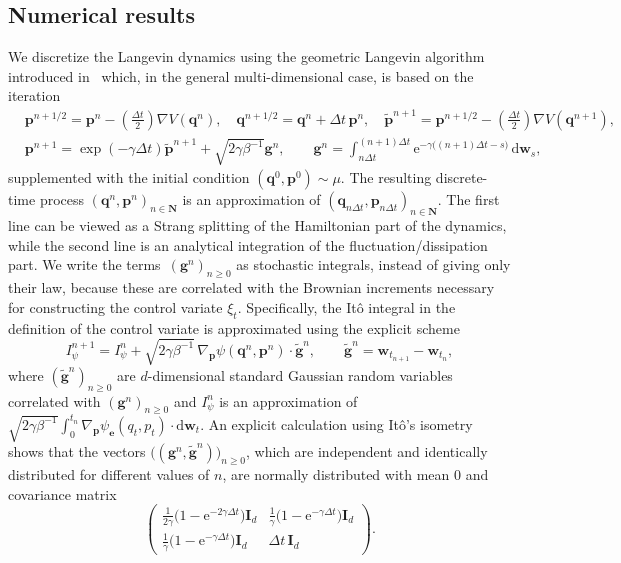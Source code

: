 \documentclass[11pt,a4paper]{article}
\newcommand{\e}{\mathrm{e}}
\newcommand{\nat}{\mathbf N}
\newcommand{\grad}{\nabla}
\newcommand{\vect}[1]{\boldsymbol{\mathbf #1}}
\newcommand{\mat}[1]{\vect #1}
\renewcommand{\d}{\mathrm d}
\theoremstyle{plain}
\numberwithin{equation}{section}
\renewcommand{\geq}{\geqslant}
\begin{document}
\subsection{Numerical results}%
\label{sub:numerical_results}
We discretize the Langevin dynamics using the geometric Langevin algorithm introduced in~\cite{MR2608370} which,
in the general multi-dimensional case, is based on the iteration
\begin{align*}
    & \vect p^{n+1/2} = \vect p^n - \left(\frac{\Delta t}{2}\right) \grad V(\vect q^n),
    \quad \vect q^{n+1/2} = \vect q^n + \Delta t \, \vect p^n,
    \quad \widetilde {\vect p}^{n+1} = \vect p^{n+1/2} - \left(\frac{\Delta t}{2}\right) \grad V(\vect q^{n+1}), \\
    & \vect p^{n+1} = \exp \left(- \gamma \Delta t \right) \widetilde {\vect p}^{n+1}
    + \sqrt{2 \gamma \beta^{-1}} \vect g^n, \qquad \vect g^n = \int_{n \Delta t}^{(n+1)\Delta t} \e^{-\gamma \bigl((n+1)\Delta t-s\bigr)} \, \d \vect w_s,
\end{align*}
supplemented with the initial condition $(\vect q^0, \vect p^0) \sim \mu$.
The resulting discrete-time process $(\vect q^n, \vect p^n)_{n \in \nat}$ is an approximation of $(\vect q_{n \Delta t}, \vect p_{n \Delta t})_{n \in \nat}$.
The first line can be viewed as a Strang splitting of the Hamiltonian part of the dynamics,
while the second line is an analytical integration of the fluctuation/dissipation part.
We write the terms~$(\vect g^n)_{n\geq0}$ as stochastic integrals, instead of giving only their law,
because these are correlated with the Brownian increments necessary for constructing the control variate $\xi_t$.
Specifically, the It\^o integral in the definition of the control variate is approximated using the explicit scheme
\[
    I_{\psi}^{n+1} = I_{\psi}^n + \sqrt{2 \gamma \beta^{-1}} \, \grad_{\vect p} \psi(\vect q^{n}, \vect p^{n}) \cdot
    \widetilde {\vect g}^n, \qquad \widetilde {\vect g}^n = \vect w_{t_{n+1}} - \vect w_{t_n},
\]
where $(\widetilde {\vect g}^n)_{n \geq 0}$ are $d$-dimensional standard Gaussian random variables correlated with $(\vect g^n)_{n \geq 0}$
and $I_{\psi}^{n}$ is an approximation of $\sqrt{2 \gamma \beta^{-1}} \int_{0}^{t_n} \grad_{\vect p} \psi_{\vect e}(q_t, p_t) \cdot \d \vect w_t$.
An explicit calculation using It\^o's isometry shows that the vectors $\bigl((\vect g^n, \widetilde {\vect g}^n)\bigr)_{n \geq 0}$,
which are independent and identically distributed for different values of $n$,
are normally distributed with mean 0 and covariance matrix
\[
    \begin{pmatrix}
        \displaystyle \frac{1}{2 \gamma} \bigl(1 - \e^{-2 \gamma \Delta t}\bigr) \mat I_d
        & \displaystyle \frac{1}{\gamma}\bigl(1 - \e^{-\gamma \Delta t}\bigr) \mat I_d \\
        \displaystyle  \frac{1}{\gamma}\bigl(1 - \e^{-\gamma \Delta t}\bigr) \mat I_d
        & \displaystyle \Delta t \, \mat I_d
    \end{pmatrix}.
\]
\end{document}
